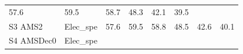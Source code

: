 \documentclass[]{article}
\begin{document}
\begin{longtable}[]{@{}llrrrrrr@{}}
\begin{minipage}[t]{0.09\columnwidth}
57.6\strut
\end{minipage} & \begin{minipage}[t]{0.09\columnwidth}\raggedleft\strut
59.5\strut
\end{minipage} & \begin{minipage}[t]{0.09\columnwidth}\raggedleft\strut
58.7\strut
\end{minipage} & \begin{minipage}[t]{0.09\columnwidth}\raggedleft\strut
48.3\strut
\end{minipage} & \begin{minipage}[t]{0.09\columnwidth}\raggedleft\strut
42.1\strut
\end{minipage} & \begin{minipage}[t]{0.09\columnwidth}\raggedleft\strut
39.5\strut
\end{minipage}\tabularnewline
\begin{minipage}[t]{0.14\columnwidth}\raggedright\strut
S3 AMS2\strut
\end{minipage} & \begin{minipage}[t]{0.13\columnwidth}\raggedright\strut
Elec\_spe\strut
\end{minipage} & \begin{minipage}[t]{0.09\columnwidth}\raggedleft\strut
57.6\strut
\end{minipage} & \begin{minipage}[t]{0.09\columnwidth}\raggedleft\strut
59.5\strut
\end{minipage} & \begin{minipage}[t]{0.09\columnwidth}\raggedleft\strut
58.8\strut
\end{minipage} & \begin{minipage}[t]{0.09\columnwidth}\raggedleft\strut
48.5\strut
\end{minipage} & \begin{minipage}[t]{0.09\columnwidth}\raggedleft\strut
42.6\strut
\end{minipage} & \begin{minipage}[t]{0.09\columnwidth}\raggedleft\strut
40.1\strut
\end{minipage}\tabularnewline
\begin{minipage}[t]{0.14\columnwidth}\raggedright\strut
S4 AMSDec0\strut
\end{minipage} & \begin{minipage}[t]{0.13\columnwidth}\raggedright\strut
Elec\_spe\strut
\end{minipage} & \begin{minipage}[t]{0.09\columnwidth}\raggedleft\strut

\end{minipage}
\end{longtable}
\end{document}
